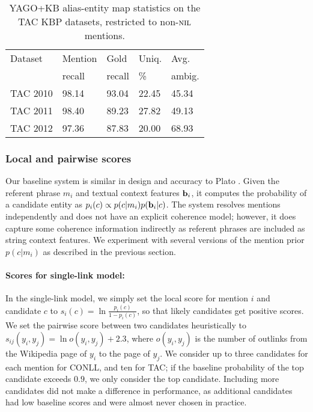 \begin{table}
  \centering
  \begin{tabular}{l|l|l|l|l}
    Dataset  & Mention &   Gold  & Uniq.  & Avg.  \\
       & recall  & recall  & \%     & ambig. \\
    \hline
    TAC 2010 &  98.14 &  93.04 &  22.45 & 45.34 \\
    \hline
    TAC 2011  & 98.40 & 89.23 & 27.82 & 49.13 \\
    \hline
    TAC 2012  & 97.36 &  87.83 & 20.00  & 68.93
  \end{tabular}
  \caption{YAGO+KB alias-entity map statistics on the TAC KBP datasets, restricted to non-$\mbox{\textsc{nil}}$ mentions.}
  \label{tab:TACAliasTable}
\end{table}


\subsubsection{Local and pairwise scores}
\label{sec:expt:features}

Our baseline system is similar in design and accuracy to Plato \cite{Lazic2015}.
Given the referent phrase $m_i$ and textual context features ${\bf b}_i$, it computes
the probability of a candidate entity as $p_i(c) \propto p(c|m_i)p({\bf b}_i|c)$. 
The system resolves mentions independently and does not have an explicit coherence model;
however, it does capture some coherence information indirectly as referent phrases are
included as string context features. We experiment with several versions of the
mention prior $p(c|m_i)$ as described in the previous section.


\paragraph*{Scores for single-link model:}
In the single-link model, we simply set the local score for
mention $i$ and candidate $c$ to $s_i(c) = \ln \frac{p_i(c )}{1 -
p_i(c)}$, so that likely candidates get positive
scores.  We set the pairwise score between two candidates heuristically to
$s_{ij}(y_i, y_j) = \ln o(y_i, y_j) + 2.3$, where $o(y_i, y_j)$ is the number of
outlinks from the Wikipedia page of $y_i$ to the page of $y_j$.  We
consider up to three candidates for each mention for CONLL, and ten for TAC; if the baseline
probability of the top candidate exceeds $0.9$, we only consider the top
candidate. Including more candidates did not make a difference in performance,
as additional candidates had low baseline scores and were almost never chosen
in practice.

